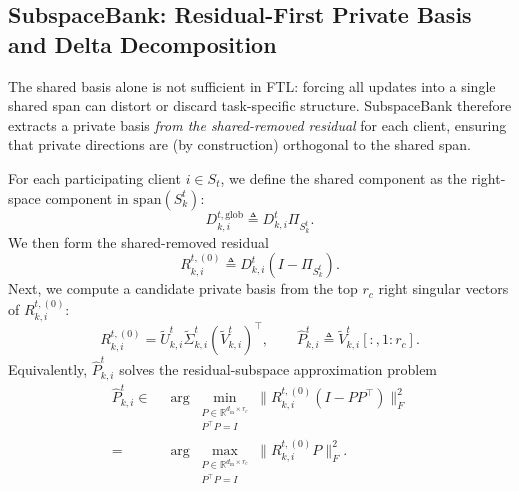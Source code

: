 \documentclass{article}
\theoremstyle{plain}
\theoremstyle{definition}
\theoremstyle{remark}
\begin{document}
\subsection{SubspaceBank: Residual-First Private Basis and Delta Decomposition}
\label{sec:private-basis}

The shared basis alone is not sufficient in FTL: forcing all updates into a single shared span can distort or discard task-specific structure. SubspaceBank therefore extracts a private basis \emph{from the shared-removed residual} for each client, ensuring that private directions are (by construction) orthogonal to the shared span.

For each participating client $i\in S_t$, we define the shared component as the right-space component in $\mathrm{span}(S_k^t)$:
\begin{equation}
  D_{k,i}^{t,\mathrm{glob}} \triangleq D_{k,i}^t \Pi_{S_k^t}.
  \label{eq:glob_comp}
\end{equation}
We then form the shared-removed residual
\begin{equation}
  R_{k,i}^{t,(0)} \triangleq D_{k,i}^t (I-\Pi_{S_k^t}).
  \label{eq:resid0}
\end{equation}
Next, we compute a candidate private basis from the top $r_c$ right singular vectors of $R_{k,i}^{t,(0)}$:
\[
  R_{k,i}^{t,(0)} = \tilde U_{k,i}^t \tilde \Sigma_{k,i}^t (\tilde V_{k,i}^t)^\top,
  \qquad
  \hat P_{k,i}^t \triangleq \tilde V_{k,i}^t[:,1{:}r_c].
\]
Equivalently, $\hat P_{k,i}^t$ solves the residual-subspace approximation problem
\begin{equation}
\begin{aligned}
  \hat P_{k,i}^t \in\;&
  \arg\min_{\substack{P\in\mathbb{R}^{d_{\mathrm{in}}\times r_c}\\ P^\top P = I}}
  \big\|R_{k,i}^{t,(0)}(I-PP^\top)\big\|_F^2 \\
  =\;&
  \arg\max_{\substack{P\in\mathbb{R}^{d_{\mathrm{in}}\times r_c}\\ P^\top P = I}}
  \big\|R_{k,i}^{t,(0)} P\big\|_F^2.
\end{aligned}
\label{eq:private_opt}
\end{equation}
\end{document}
